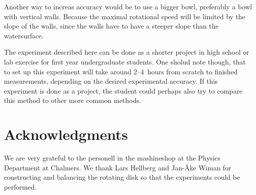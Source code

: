 \documentclass[11pt,towcolumn, swedish, english]{article}
\begin{document}
Another way to increas accuracy would be to use a bigger bowl,
preferably a bowl with vertical walls. Because the maximal rotational
speed will be limited by the slope of the walls, since the walls have
to have a steeper slope than the watersurface.

The experiment described here can be done as a shorter project in high
school or lab exercise for first year undergraduate students. One
sholud note though, that to set up this experiment will take around
2--4~hours from scratch to finished measurements, depending on the
desired experimental accuracy. If this experiment is done as a
project, the student could perhaps also try to compare this method to
other more common methods.


\section*{Acknowledgments}
We are very grateful to the personell in the mashineshop at the
Physics Department at Chalmers. We thank Lars Hellberg and Jan-Åke
Wiman for constructing and balancing the rotating disk so that the
experiments could be performed. 





\end{document}
